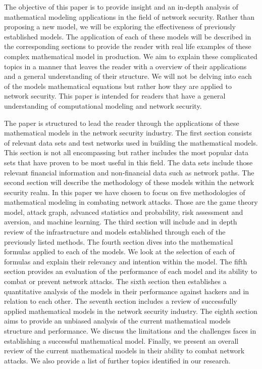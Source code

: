 \documentclass{article}
\begin{document}
The objective of this paper is to provide insight and an in-depth analysis of mathematical modeling applications in the field of network security. Rather than proposing a new model, we will be exploring the effectiveness of previously established models. The application of each of these models will be described in the corresponding sections to provide the reader with real life examples of these complex mathematical model in production. We aim to explain these complicated topics in a manner that leaves the reader with a overview of their applications and a general understanding of their structure. We will not be delving into each of the models mathematical equations but rather how they are applied to network security. This paper is intended for readers that have a general understanding of computational modeling and network security. 

The paper is structured to lead the reader through the applications of these mathematical models in the network security industry. The first section consists of relevant data sets and test networks used in building the mathematical models. This section is not all encompassing but rather includes the most popular data sets that have proven to be most useful in this field. The data sets include those relevant financial information and non-financial data such as network paths. The second section will describe the methodology of these models within the network security realm. In this paper we have chosen to focus on five methodologies of mathematical modeling in combating network attacks. Those are the game theory model, attack graph, advanced statistics and probability, risk assessment and aversion, and machine learning. The third section will include and in depth review of the infrastructure and models established through each of the previously listed methods. The fourth section dives into the mathematical formulas applied to each of the models. We look at the selection of each of formulas and explain their relevancy and intention within the model. The fifth section provides an evaluation of the performance of each model and its ability to combat or prevent network attacks. The sixth section then establishes a quantitative analysis of the models in their performance against hackers and in relation to each other. The seventh section includes a review of successfully applied mathematical models in the network security industry. The eighth section aims to provide an unbiased analysis of the current mathematical models structure and performance. We discuss the limitations and the challenges faces in establishing a successful mathematical model. Finally, we present an overall review of the current mathematical models in their ability to combat network attacks. We also provide a list of further topics identified in our research. 
\end{document}

